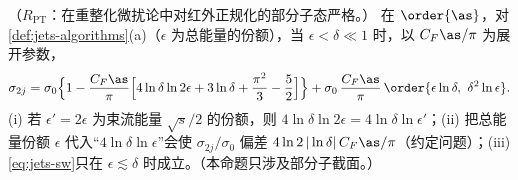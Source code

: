 \begin{proposition}\label{prop:jets-sw}
（$R_{\mathrm{PT}}$：在重整化微扰论中对红外正规化的部分子态严格。）
在 $\order{\as}$，对\cref{def:jets-algorithms}(a)（$\epsilon$ 为总能量的份额），当 $\epsilon<\delta\ll1$ 时，以 $C_F\as/\pi$ 为展开参数，
\begin{equation}\label{eq:jets-sw}
\sigma_{2j}=\sigma_0\Big\{1-\frac{C_F\as}{\pi}\Big[4\ln\delta\ln2\epsilon+3\ln\delta+\frac{\pi^2}{3}-\frac52\Big]\Big\}
+\sigma_0\,\frac{C_F\as}{\pi}\,\order{\epsilon\ln\delta,\ \delta^2\ln\epsilon} .
\end{equation}
(i) 若 $\epsilon'=2\epsilon$ 为束流能量 $\sqrt s/2$ 的份额，则 $4\ln\delta\ln2\epsilon=4\ln\delta\ln\epsilon'$；(ii) 把总能量份额 $\epsilon$ 代入“$4\ln\delta\ln\epsilon$”会使 $\sigma_{2j}/\sigma_0$
偏差 $4\ln2\,|\ln\delta|\,C_F\as/\pi$（约定问题）；(iii) \cref{eq:jets-sw}只在 $\epsilon\lesssim\delta$ 时成立。（本命题只涉及部分子截面。）
\end{proposition}

